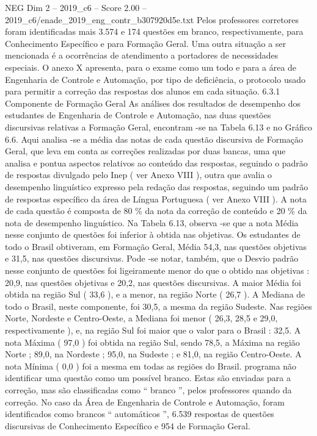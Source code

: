 \begin{textsample}{NEG Dim 2 – 2019\_c6 – Score 2.00 – 2019\_c6/enade\_2019\_eng\_contr\_b307920d5e.txt}
Pelos professores corretores foram identificadas mais 3.574 e 174 questões em branco, respectivamente, para Conhecimento Específico e para Formação Geral.
Uma outra situação a ser mencionada é a ocorrências de atendimento a portadores de necessidades especiais.
O anexo X apresenta, para o exame como um todo e para a área de Engenharia de Controle e Automação, por tipo de deficiência, o protocolo usado para permitir a correção das respostas dos alunos em cada situação. 6.3.1 Componente de Formação Geral As análises dos resultados de desempenho dos estudantes de Engenharia de Controle e Automação, nas duas questões discursivas relativas a Formação Geral, encontram -se na Tabela 6.13 e no Gráfico 6.6.
Aqui analisa -se a média das notas de cada questão discursiva de Formação Geral, que leva em conta as correções realizadas por duas bancas, uma que analisa e pontua aspectos relativos ao conteúdo das respostas, seguindo o padrão de respostas divulgado pelo Inep ( ver Anexo VIII ), outra que avalia o desempenho linguístico expresso pela redação das respostas, seguindo um padrão de respostas específico da área de Língua Portuguesa ( ver Anexo VIII ).
A nota de cada questão é composta de 80 \% da nota da correção de conteúdo e 20 \% da nota de desempenho linguístico.
Na Tabela 6.13, observa -se que a nota Média nesse conjunto de questões foi inferior à obtida nas objetivas.
Os estudantes de todo o Brasil obtiveram, em Formação Geral, Média 54,3, nas questões objetivas e 31,5, nas questões discursivas.
Pode -se notar, também, que o Desvio padrão nesse conjunto de questões foi ligeiramente menor do que o obtido nas objetivas : 20,9, nas questões objetivas e 20,2, nas questões discursivas.
A maior Média foi obtida na região Sul ( 33,6 ), e a menor, na região Norte ( 26,7 ).
A Mediana de todo o Brasil, neste componente, foi 30,5, a mesma da região Sudeste.
Nas regiões Norte, Nordeste e Centro-Oeste, a Mediana foi menor ( 26,3, 28,5 e 29,0, respectivamente ), e, na região Sul foi maior que o valor para o Brasil : 32,5.
A nota Máxima ( 97,0 ) foi obtida na região Sul, sendo 78,5, a Máxima na região Norte ; 89,0, na Nordeste ; 95,0, na Sudeste ; e 81,0, na região Centro-Oeste.
A nota Mínima ( 0,0 ) foi a mesma em todas as regiões do Brasil. programa não identificar uma questão como um possível branco.
Estas são enviadas para a correção, mas são classificadas como “ branco ”, pelos professores quando da correção.
No caso da Área de Engenharia de Controle e Automação, foram identificados como brancos “ automáticos ”, 6.539 respostas de questões discursivas de Conhecimento Específico e 954 de Formação Geral.

\end{textsample}
